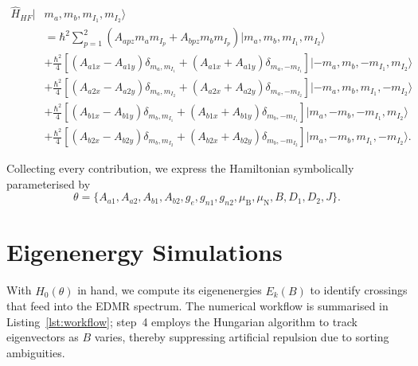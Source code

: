 \documentclass[svgnames]{article}
\begin{document}
\begin{equation} \label{hyperfine}
    \begin{split}
    \hat{H}_{HF} |&m_a, m_b, m_{I_1}, m_{I_2}\rangle  \\
                       &= \hbar^2 \sum_{p=1}^{2} \left(A_{apz}m_am_{I_p} +
                       A_{bpz}m_bm_{I_p} \right) |m_a, m_b, m_{I_1},
                       m_{I_2}\rangle  \\ 
                       &+\frac{\hbar^2}{4}\left[\left( A_{a1x}-A_{a1y} \right)
                           \delta_{m_a, m_{I_1}} + \left( A_{a1x} + A_{a1y}
                           \right) \delta_{m_a, -m_{I_1}}  \right] |-m_a, m_b,
                           -m_{I_1}, m_{I_2}\rangle \\ 
                       &+\frac{\hbar^2}{4}\left[\left( A_{a2x}-A_{a2y} \right)
                           \delta_{m_a, m_{I_2}} + \left( A_{a2x} + A_{a2y}
                           \right) \delta_{m_a, -m_{I_2}}  \right] |-m_a, m_b,
                            m_{I_1}, -m_{I_2}\rangle \\ 
                       &+\frac{\hbar^2}{4}\left[\left( A_{b1x}-A_{b1y} \right)
                           \delta_{m_b, m_{I_1}} + \left( A_{b1x} + A_{b1y}
                           \right) \delta_{m_b, -m_{I_1}}  \right] |m_a, -m_b,
                           -m_{I_1}, m_{I_2}\rangle \\ 
                       &+\frac{\hbar^2}{4}\left[\left( A_{b2x}-A_{b2y} \right)
                           \delta_{m_b, m_{I_2}} + \left( A_{b2x} + A_{b2y}
                           \right) \delta_{m_b, -m_{I_2}}  \right] |m_a, -m_b,
                           m_{I_1}, -m_{I_2}\rangle.   
\end{split}
\end{equation}

\medskip
Collecting every contribution, we express the Hamiltonian symbolically parameterised by
\[
  \theta = \{A_{a1},A_{a2},A_{b1},A_{b2},g_e,g_{n1},g_{n2},\mu_{\mathrm B},\mu_{\mathrm N},B,D_1,D_2,J\}.
\]

\section{Eigenenergy Simulations}\label{sec:eigensims}
With $\hat{H}_0(\theta)$ in hand, we compute its eigenenergies $E_k(B)$ to identify crossings that feed into the EDMR spectrum. The numerical workflow is summarised in Listing~\ref{lst:workflow}; step~4 employs the Hungarian algorithm to track eigenvectors as $B$ varies, thereby suppressing artificial repulsion due to sorting ambiguities.
\end{document}
